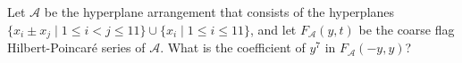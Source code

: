 Let $\mathcal{A}$ be the hyperplane arrangement that consists of the hyperplanes $\{x_i \pm x_j \mid 1\le i < j \le 11\}\cup \{ x_i \mid 1\le i \le 11 \} $, and let $F_{\mathcal{A}}(y,t)$ be the coarse flag Hilbert-Poincaré series of $\mathcal{A}$.
What is the coefficient of $y^7$ in $F_{\mathcal{A}}(-y,y)$?
